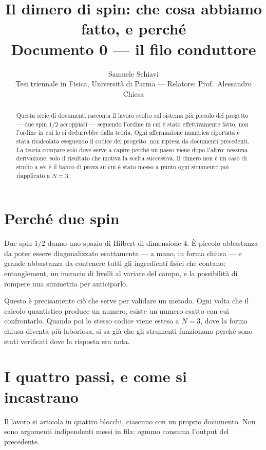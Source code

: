 \documentclass[11pt,a4paper]{article}
\title{\bfseries Il dimero di spin: che cosa abbiamo fatto, e perché\\[2pt]
\large Documento 0 --- il filo conduttore}
\author{Samuele Schiavi \\ \small Tesi triennale in Fisica, Università di Parma
--- Relatore: Prof.\ Alessandro Chiesa}
\date{}
\begin{document}
\maketitle
\thispagestyle{fancy}

\begin{abstract}
\noindent
Questa serie di documenti racconta il lavoro svolto sul sistema più piccolo del
progetto --- due spin $1/2$ accoppiati --- seguendo l'ordine in cui è stato
effettivamente fatto, non l'ordine in cui lo si dedurrebbe dalla teoria. Ogni
affermazione numerica riportata è stata ricalcolata eseguendo il codice del
progetto, non ripresa da documenti precedenti. La teoria compare solo dove serve
a capire perché un passo viene dopo l'altro: nessuna derivazione, solo il
risultato che motiva la scelta successiva. Il dimero non è un caso di studio a
sé: è il banco di prova su cui è stato messo a punto ogni strumento poi
riapplicato a $N=3$.
\end{abstract}

\section{Perché due spin}

Due spin $1/2$ danno uno spazio di Hilbert di dimensione $4$. È piccolo abbastanza
da poter essere diagonalizzato esattamente --- a mano, in forma chiusa --- e
grande abbastanza da contenere tutti gli ingredienti fisici che contano:
entanglement, un incrocio di livelli al variare del campo, e la possibilità di
rompere una simmetria per anticiparlo.

Questo è precisamente ciò che serve per validare un metodo. Ogni volta che il
calcolo quantistico produce un numero, esiste un numero esatto con cui
confrontarlo. Quando poi lo stesso codice viene esteso a $N=3$, dove la forma
chiusa diventa più laboriosa, si sa già che gli strumenti funzionano perché sono
stati verificati dove la risposta era nota.


\section{I quattro passi, e come si incastrano}

Il lavoro si articola in quattro blocchi, ciascuno con un proprio documento. Non
sono argomenti indipendenti messi in fila: ognuno consuma l'output del
precedente.
\end{document}
